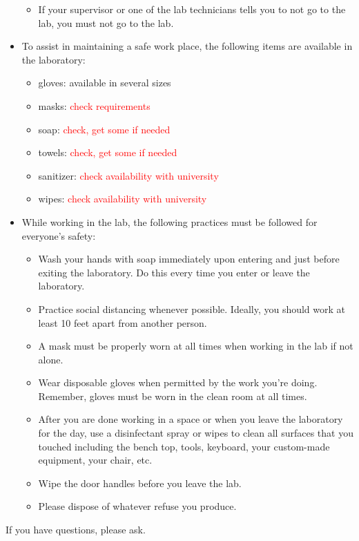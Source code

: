\begin{itemize}
\begin{itemize}
	\item If your supervisor or one of the lab technicians tells you to not go to the lab, you must not go to the lab.
    \end{itemize}
\item To assist in maintaining a safe work place, the following items are available in the laboratory:
	\begin{itemize}
	\item gloves: available in several sizes
	\item masks: \textcolor{red}{check requirements}
	\item soap: \textcolor{red}{check, get some if needed}
	\item towels: \textcolor{red}{check, get some if needed}
	\item sanitizer: \textcolor{red}{check availability with university}
	\item wipes: \textcolor{red}{check availability with university}
	\end{itemize}
\newpage
\item While working in the lab, the following practices must be followed for everyone's safety:
	\begin{itemize}
		\item Wash your hands with soap immediately upon entering and just before exiting the laboratory.  Do this every time you enter or leave the laboratory.
		\item Practice social distancing whenever possible.  Ideally, you should work at least 10 feet apart from another person.
		\item A mask must be properly worn at all times when working in the lab if not alone.
		\item Wear disposable gloves when permitted by the work you're doing.  Remember, gloves must be worn in the clean room at all times.
		\item After you are done working in a space or when you leave the laboratory for the day, use a disinfectant spray or wipes to 	clean all surfaces that you touched including the bench top, tools, keyboard, your custom-made equipment, your chair, etc.
		\item Wipe the door handles before you leave the lab.
		\item Please dispose of whatever refuse you produce.
	\end{itemize}
\end{itemize}

If you have questions, please ask. 

